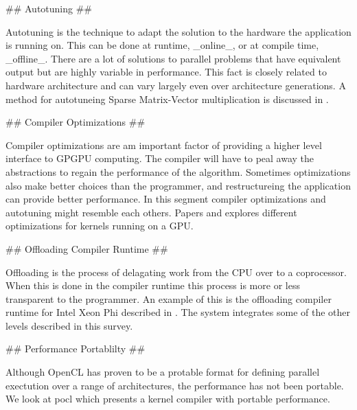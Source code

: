 \begin{markdown}
## Autotuning ##

Autotuning is the technique to adapt the solution to the hardware the
application is running on. This can be done at runtime, _online_, or
at compile time, _offline_. There are a lot of solutions to parallel
problems that have equivalent output but are highly variable in
performance. This fact is closely related to hardware architecture and
can vary largely even over architecture generations. A method for
autotuneing Sparse Matrix-Vector multiplication is discussed in
\cite{auto}.


## Compiler Optimizations ##

Compiler optimizations are am important factor of providing a higher
level interface to GPGPU computing. The compiler will have to peal
away the abstractions to regain the performance of the
algorithm. Sometimes optimizations also make better choices than
the programmer, and restructureing the application can provide better
performance. In this segment compiler optimizations and autotuning
might resemble each others. Papers \cite{thd-coa} and \cite{mem-acc}
explores different optimizations for kernels running on a GPU.  

## Offloading Compiler Runtime ##

Offloading is the process of delagating work from the CPU over to a
coprocessor. When this is done in the compiler runtime this process is
more or less transparent to the programmer. An example of this is the
offloading compiler runtime for Intel Xeon Phi described in
\cite{phi}. The system integrates some of the other levels described
in this survey.

## Performance Portablilty ##

Although OpenCL has proven to be a protable format for defining
parallel exectution over a range of architectures, the performance has
not been portable. We look at pocl \cite{pocl} which presents a kernel
compiler with portable performance.



\end{markdown}


